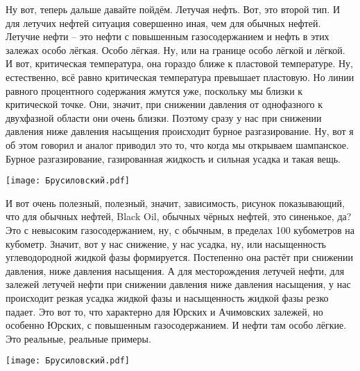 \documentclass[main.tex]{subfiles}
\begin{document}
Ну вот, теперь дальше давайте пойдём.
Летучая нефть.
Вот, это второй тип.
И для летучих нефтей ситуация совершенно иная, чем для обычных нефтей.
Летучие нефти -- это нефти с повышенным газосодержанием и нефть в этих залежах особо лёгкая.
Особо лёгкая.
Ну, или на границе особо лёгкой и лёгкой.
И вот, критическая температура, она гораздо ближе к пластовой температуре.
Ну, естественно, всё равно критическая температура превышает пластовую.
Но линии равного процентного содержания жмутся уже, поскольку мы близки к критической точке.
Они, значит, при снижении давления от однофазного к двухфазной области они очень близки.
Поэтому сразу у нас при снижении давления ниже давления насыщения происходит бурное разгазирование.
Ну, вот я об этом говорил и аналог приводил это то, что когда мы открываем шампанское.
Бурное разгазирование, газированная жидкость и сильная усадка и такая вещь.

\begin{center}
\texttt{[image: Брусиловский.pdf]}
\end{center}

И вот очень полезный, полезный, значит, зависимость, рисунок показывающий, что для обычных нефтей, Black Oil, обычных чёрных нефтей, это синенькое, да?
Это с невысоким газосодержанием, ну, с обычным, в пределах 100 кубометров на кубометр.
Значит, вот у нас снижение, у нас усадка, ну, или насыщенность углеводородной жидкой фазы формируется.
Постепенно она растёт при снижении давления, ниже давления насыщения.
А для месторождения летучей нефти, для залежей летучей нефти при снижении давления ниже давления насыщения, у нас происходит резкая усадка жидкой фазы и насыщенность жидкой фазы резко падает.
Это вот то, что характерно для Юрских и Ачимовских залежей, но особенно Юрских, с повышенным газосодержанием.
И нефти там особо лёгкие. Это реальные, реальные примеры.

\begin{center}
\texttt{[image: Брусиловский.pdf]}
\end{center}
\end{document}
